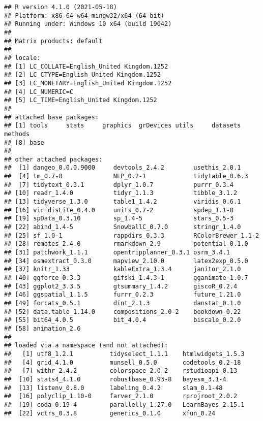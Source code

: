 \documentclass[
  12pt,
]{article}
\begin{document}
\begin{verbatim}
## R version 4.1.0 (2021-05-18)
## Platform: x86_64-w64-mingw32/x64 (64-bit)
## Running under: Windows 10 x64 (build 19042)
## 
## Matrix products: default
## 
## locale:
## [1] LC_COLLATE=English_United Kingdom.1252 
## [2] LC_CTYPE=English_United Kingdom.1252   
## [3] LC_MONETARY=English_United Kingdom.1252
## [4] LC_NUMERIC=C                           
## [5] LC_TIME=English_United Kingdom.1252    
## 
## attached base packages:
## [1] tools     stats     graphics  grDevices utils     datasets  methods  
## [8] base     
## 
## other attached packages:
##  [1] dangeo_0.0.0.9000     devtools_2.4.2        usethis_2.0.1        
##  [4] tm_0.7-8              NLP_0.2-1             tidytable_0.6.3      
##  [7] tidytext_0.3.1        dplyr_1.0.7           purrr_0.3.4          
## [10] readr_1.4.0           tidyr_1.1.3           tibble_3.1.2         
## [13] tidyverse_1.3.0       table1_1.4.2          viridis_0.6.1        
## [16] viridisLite_0.4.0     units_0.7-2           spdep_1.1-8          
## [19] spData_0.3.10         sp_1.4-5              stars_0.5-3          
## [22] abind_1.4-5           SnowballC_0.7.0       stringr_1.4.0        
## [25] sf_1.0-1              rappdirs_0.3.3        RColorBrewer_1.1-2   
## [28] remotes_2.4.0         rmarkdown_2.9         potential_0.1.0      
## [31] patchwork_1.1.1       opentripplanner_0.3.1 osrm_3.4.1           
## [34] osmextract_0.3.0      mapview_2.10.0        latex2exp_0.5.0      
## [37] knitr_1.33            kableExtra_1.3.4      janitor_2.1.0        
## [40] ggforce_0.3.3         gifski_1.4.3-1        gganimate_1.0.7      
## [43] ggplot2_3.3.5         gtsummary_1.4.2       giscoR_0.2.4         
## [46] ggspatial_1.1.5       furrr_0.2.3           future_1.21.0        
## [49] forcats_0.5.1         dint_2.1.3            danstat_0.1.0        
## [52] data.table_1.14.0     compositions_2.0-2    bookdown_0.22        
## [55] bit64_4.0.5           bit_4.0.4             biscale_0.2.0        
## [58] animation_2.6        
## 
## loaded via a namespace (and not attached):
##   [1] utf8_1.2.1          tidyselect_1.1.1    htmlwidgets_1.5.3  
##   [4] grid_4.1.0          munsell_0.5.0       codetools_0.2-18   
##   [7] withr_2.4.2         colorspace_2.0-2    rstudioapi_0.13    
##  [10] stats4_4.1.0        robustbase_0.93-8   bayesm_3.1-4       
##  [13] listenv_0.8.0       labeling_0.4.2      slam_0.1-48        
##  [16] polyclip_1.10-0     farver_2.1.0        rprojroot_2.0.2    
##  [19] coda_0.19-4         parallelly_1.27.0   LearnBayes_2.15.1  
##  [22] vctrs_0.3.8         generics_0.1.0      xfun_0.24          

\end{verbatim}
\end{document}
